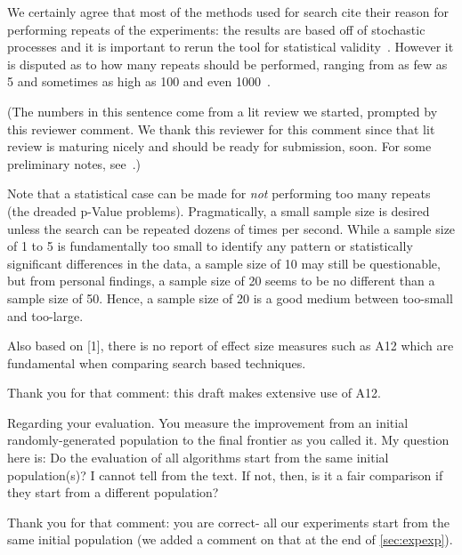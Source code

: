 \documentclass[10pt,journal,compsoc]{IEEEtran}
\newcommand{\tion}[1]{\textsection\ref{sec:#1}}
\newenvironment{changed}{\par\color{MyDarkBlue}}{\par}
\begin{document}
\begin{changed}

We certainly agree that most of the methods used for
search cite their reason for performing repeats of
the experiments: the results are based off of
stochastic processes and it is important to rerun
the tool for statistical validity~\cite{1334912}.
However it is disputed as to how many repeats should
be performed, ranging from as few as 5 and sometimes
as high as 100 and even 1000~\cite{krall14f}.

(The numbers in this sentence
come from a lit review we started, prompted by this reviewer comment. We thank
this reviewer for this comment since that lit review is maturing nicely and should be ready for submission, soon.
For some preliminary notes, see~\cite{krall14f}.)

Note that a statistical case can be made for {\em not} performing too many repeats~\cite{isre.2013.0480}
(the dreaded p-Value problems).
Pragmatically, a small sample size is desired unless
the search can be repeated dozens of times per
second.  While a sample size of 1 to 5 is
fundamentally too small to identify any pattern or
statistically significant differences in the data, a
sample size of 10 may still be questionable, but
from personal findings, a sample size of 20 seems to
be no different than a sample size of 50.  Hence, a
sample size of 20 is a good medium between too-small
and too-large.


\end{changed}

Also based on [1], there is no report of effect size measures such as A12 which are fundamental when comparing search based techniques.

\begin{changed}
Thank you for that comment: this draft makes extensive use of A12.
\end{changed}

Regarding your evaluation. You measure the improvement from an initial randomly-generated population to the final frontier as you called it. My question here is: Do the evaluation of all algorithms start from the same initial population(s)? I cannot tell from the text. If not, then, is it a fair comparison if they start from a different population?

\begin{changed}
Thank you for that comment: you are correct- all our experiments start from the same initial population
(we added a comment on that at the end of \tion{expexp}).
\end{changed}
\end{document}
